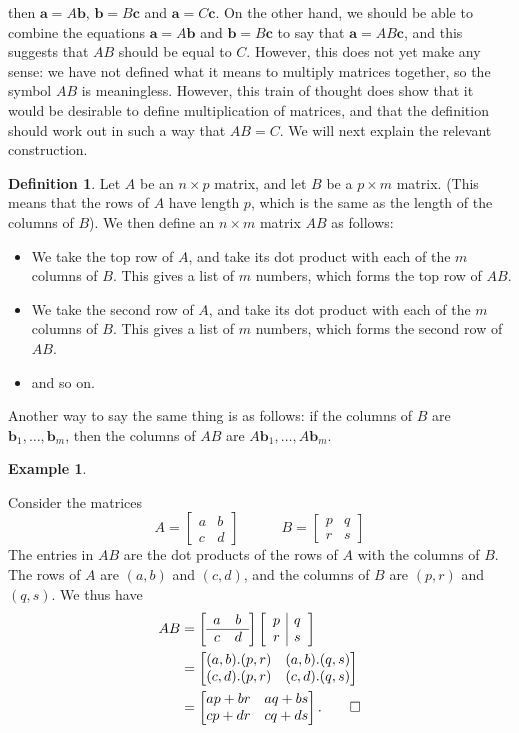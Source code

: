 \documentclass[a4paper]{book}
\newcommand{\bbm}       {\begin{bmatrix}}
\newcommand{\ebm}       {\end{bmatrix}}
\newcommand{\tm}        {\times}
\newcommand{\VEC}[1]    {\mathbf{#1}}
\renewcommand{\:}{\colon}
\newcommand{\bilabel}[1]{\hypertarget{#1}{\label{#1}}}
\theoremstyle{definition}
\newtheorem{definition}[theorem]{Definition}
\newtheorem{example}[theorem]{Example}
\begin{document}
then $\VEC{a}=A\VEC{b}$, $\VEC{b}=B\VEC{c}$ and $\VEC{a}=C\VEC{c}$.
On the other hand, we should be able to combine the equations
$\VEC{a}=A\VEC{b}$ and $\VEC{b}=B\VEC{c}$ to say that
$\VEC{a}=AB\VEC{c}$, and this suggests that $AB$ should be equal to
$C$.  However, this does not yet make any sense: we have not defined
what it means to multiply matrices together, so the symbol $AB$ is
meaningless.  However, this train of thought does show that it would
be desirable to define multiplication of matrices, and that the
definition should work out in such a way that $AB=C$.  We will next
explain the relevant construction.

\begin{definition}
 Let $A$ be an $n\tm p$ matrix, and let $B$ be a $p\tm m$ matrix.
 (This means that the rows of $A$ have length $p$, which is the same
 as the length of the columns of $B$).  We then define an $n\tm m$
 matrix $AB$ as follows:
 \begin{itemize}
  \item We take the top row of $A$, and take its dot product with each
   of the $m$ columns of $B$.  This gives a list of $m$ numbers, which
   forms the top row of $AB$.
  \item We take the second row of $A$, and take its dot product with each
   of the $m$ columns of $B$.  This gives a list of $m$ numbers, which
   forms the second row of $AB$.
  \item and so on.
 \end{itemize}

 Another way to say the same thing is as follows: if the columns of
 $B$ are $\VEC{b}_1,\dotsc,\VEC{b}_m$, then the columns of $AB$ are
 $A\VEC{b}_1,\dotsc,A\VEC{b}_m$. 
\end{definition}
\begin{example}\bilabel{eg-mat-mult-two}
 Consider the matrices
 \[ A = \bbm a & b \\ c & d \ebm \hspace{3em}
    B = \bbm p & q \\ r & s \ebm
 \]
 The entries in $AB$ are the dot products of the rows of $A$ with the
 columns of $B$.  The rows of $A$ are $(a,b)$ and $(c,d)$, and the
 columns of $B$ are $(p,r)$ and $(q,s)$.  We thus have
 \begin{align*}
  AB &=
     \left[\begin{array}{cc} a & b \\ \hline c & d \end{array}\right]
     \left[\begin{array}{c|c} p & q \\ r & s \end{array}\right] \\
  &= \bbm (a,b).(p,r) & (a,b).(q,s) \\
          (c,d).(p,r) & (c,d).(q,s) \ebm \\
  &= \bbm ap+br & aq+bs \\ cp+dr & cq+ds \ebm. \qed
 \end{align*}
\end{example}
\end{document}
